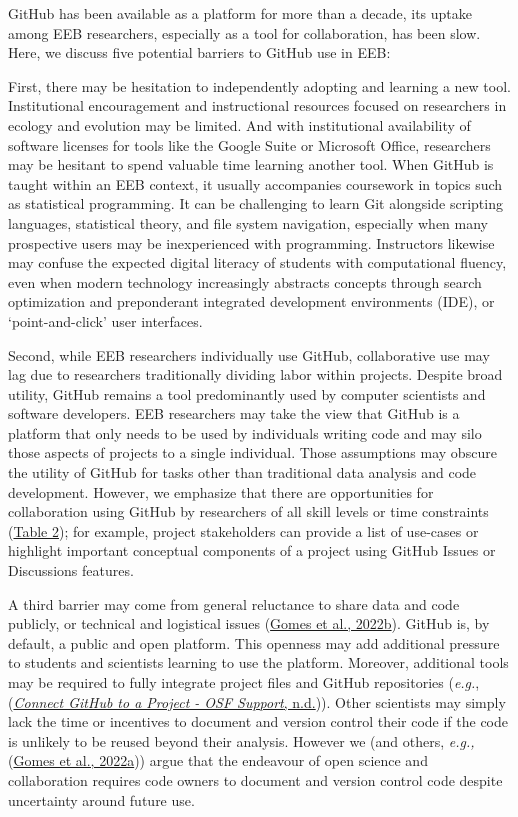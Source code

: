 GitHub has been available as a platform for more than a decade, its uptake among EEB researchers, especially as a tool for collaboration, has been slow. Here, we discuss five potential barriers to GitHub use in EEB:

First, there may be hesitation to independently adopting and learning a new tool.
Institutional encouragement and instructional resources focused on researchers in ecology and evolution may be limited.
And with institutional availability of software licenses for tools like the Google Suite or Microsoft Office, researchers may be hesitant to spend valuable time learning another tool.
When GitHub is taught within an EEB context, it usually accompanies coursework in topics such as statistical programming.
It can be challenging to learn Git alongside scripting languages, statistical theory, and file system navigation, especially when many prospective users may be inexperienced with programming.
Instructors likewise may confuse the expected digital literacy of students with computational fluency, even when modern technology increasingly abstracts concepts through search optimization and preponderant integrated development environments (IDE), or `point-and-click' user interfaces.

Second, while EEB researchers individually use GitHub, collaborative use may lag due to researchers traditionally dividing labor within projects.
Despite broad utility, GitHub remains a tool predominantly used by computer scientists and software developers.
EEB researchers may take the view that GitHub is a platform that only needs to be used by individuals writing code and may silo those aspects of projects to a single individual.
Those assumptions may obscure the utility of GitHub for tasks other than traditional data analysis and code development.
However, we emphasize that there are opportunities for collaboration using GitHub by researchers of all skill levels or time constraints (\protect\hyperlink{tbl:roles}{Table 2}); for example, project stakeholders can provide a list of use-cases or highlight important conceptual components of a project using GitHub Issues or Discussions features.

A third barrier may come from general reluctance to share data and code publicly, or technical and logistical issues (\protect\hyperlink{ref-pq2Tv1BC}{Gomes et al., 2022b}).
GitHub is, by default, a public and open platform.
This openness may add additional pressure to students and scientists learning to use the platform.
Moreover, additional tools may be required to fully integrate project files and GitHub repositories (\emph{e.g.}, (\protect\hyperlink{ref-lx49NGto}{\emph{Connect GitHub to a Project - OSF Support}, n.d.})).
Other scientists may simply lack the time or incentives to document and version control their code if the code is unlikely to be reused beyond their analysis.
However we (and others, \emph{e.g.,} (\protect\hyperlink{ref-VDJput1V}{Gomes et al., 2022a})) argue that the endeavour of open science and collaboration requires code owners to document and version control code despite uncertainty around future use.

